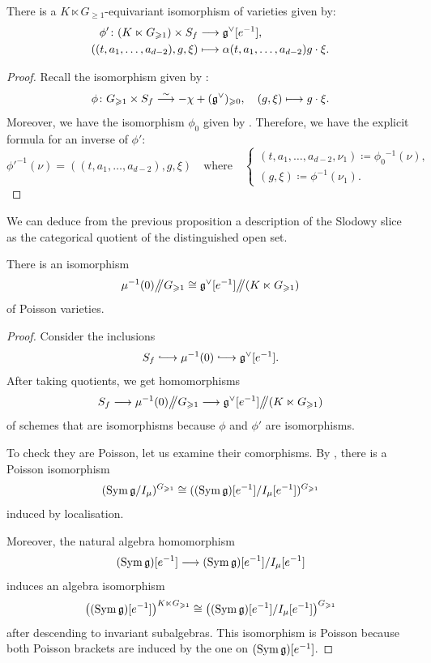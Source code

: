 \begin{proposition} \label{proposition:dilation-gan-ginzburg}
	There is a $K \ltimes G_{\geqslant 1}$-equivariant isomorphism of varieties given by:
	\[ \begin{split}
		\phi' \colon (K \ltimes G_{\geqslant 1}) \times S_f & \longrightarrow \mathfrak g^\vee[e^{-1}], \\
		((t, a_1, \dots, a_{d-2}), g, \xi) & \longmapsto \alpha(t, a_1, \dots, a_{d-2}) g \cdot \xi. 
	\end{split} \]
\end{proposition}

\begin{proof}
	Recall the isomorphism given by :
	\[ \phi \colon G_{\geqslant 1} \times S_f \overset{\sim}{\longrightarrow} - \chi + (\mathfrak g^\vee)_{\geqslant 0}, \quad (g, \xi) \longmapsto g \cdot \xi.  \]
	Moreover, we have the isomorphism $\phi_0$ given by . Therefore, we have the explicit formula for an inverse of $\phi'$:
	\[ \phi'^{-1}(\nu) = ((t, a_1, \dots, a_{d-2}), g, \xi) \quad \text{where} \quad \begin{cases}
		(t, a_1, \dots, a_{d-2}, \nu_1) \coloneq \phi_0{}^{-1}(\nu), \\
		(g, \xi) \coloneq \phi^{-1}(\nu_1).
	\end{cases} \]
\end{proof}

We can deduce from the previous proposition a description of the Slodowy slice as the categorical quotient of the distinguished open set.

\begin{theorem} \label{theorem:slodowy-git}
	There is an isomorphism
	\[ \mu^{-1}(0) \big/\!\!\big/ G_{\geqslant 1} \cong \mathfrak g^\vee[e^{-1}] \big/\!\!\big/ (K \ltimes G_{\geqslant 1}) \]
	of Poisson varieties.
\end{theorem}

\begin{proof}
	Consider the inclusions
	\[ S_f \hooklongrightarrow \mu^{-1}(0) \hooklongrightarrow \g^\vee[e^{-1}] . \]
	After taking quotients, we get homomorphisms
	\[ S_f \longrightarrow \mu^{-1}(0) \big/\!\!\big/ G_{\geqslant 1} \longrightarrow \mathfrak g^\vee[e^{-1}]\big/\!\!\big/ (K \ltimes G_{\geqslant 1}) \]
	of schemes that are isomorphisms because $\phi$ and $\phi'$ are isomorphisms. 
	
	To check they are Poisson, let us examine their comorphisms. By , there is a Poisson isomorphism
	\[ (\operatorname{Sym} \mathfrak g / I_{\mu})^{G_{\geqslant 1}} \cong ((\operatorname{Sym} \mathfrak g)[e^{-1}] / I_{\mu} [e^{-1}])^{G_{\geqslant 1}}   \]
	induced by localisation.
	
	Moreover, the natural algebra homomorphism
	\[ (\operatorname{Sym} \mathfrak g)[e^{-1}] \longrightarrow  (\operatorname{Sym} \mathfrak g)[e^{-1}] / I_{\mu} [e^{-1}] \]
	induces an algebra isomorphism
	\[ \big((\operatorname{Sym} \mathfrak g)[e^{-1}]\big)^{K \ltimes G_{\geqslant 1}} \cong \big((\operatorname{Sym} \mathfrak g)[e^{-1}] / I_{\mu} [e^{-1}]\big)^{G_{\geqslant 1}} \]
	after descending to invariant subalgebras. This isomorphism is Poisson because both Poisson brackets are induced by the one on $(\operatorname{Sym} \mathfrak g)[e^{-1}]$.
\end{proof}

